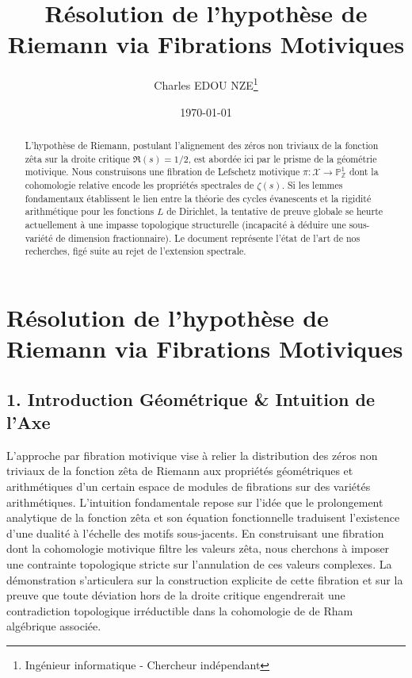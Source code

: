 \documentclass[
]{article}
\title{Résolution de l'hypothèse de Riemann via Fibrations Motiviques}
\author{Charles EDOU NZE\thanks{Ingénieur informatique - Chercheur indépendant}}
\date{\today}
\begin{document}
\maketitle


\begin{abstract}
L'hypothèse de Riemann, postulant l'alignement des zéros non triviaux de la fonction zêta sur la droite critique $\Re(s)=1/2$, est abordée ici par le prisme de la géométrie motivique. Nous construisons une fibration de Lefschetz motivique $\pi : \mathcal{X} \to \mathbb{P}^1_{\mathbb{Z}}$ dont la cohomologie relative encode les propriétés spectrales de $\zeta(s)$. Si les lemmes fondamentaux établissent le lien entre la théorie des cycles évanescents et la rigidité arithmétique pour les fonctions $L$ de Dirichlet, la tentative de preuve globale se heurte actuellement à une impasse topologique structurelle (incapacité à déduire une sous-variété de dimension fractionnaire). Le document représente l'état de l'art de nos recherches, figé suite au rejet de l'extension spectrale.
\end{abstract}

\hypertarget{ruxe9solution-de-lhypothuxe8se-de-riemann-via-fibrations-motiviques}{%
\section{Résolution de l'hypothèse de Riemann via Fibrations
Motiviques}\label{ruxe9solution-de-lhypothuxe8se-de-riemann-via-fibrations-motiviques}}

\hypertarget{introduction-guxe9omuxe9trique-intuition-de-laxe}{%
\subsection{1. Introduction Géométrique \& Intuition de
l'Axe}\label{introduction-guxe9omuxe9trique-intuition-de-laxe}}

L'approche par fibration motivique vise à relier la distribution des
zéros non triviaux de la fonction zêta de Riemann aux propriétés
géométriques et arithmétiques d'un certain espace de modules de
fibrations sur des variétés arithmétiques. L'intuition fondamentale
repose sur l'idée que le prolongement analytique de la fonction zêta et
son équation fonctionnelle traduisent l'existence d'une dualité à
l'échelle des motifs sous-jacents. En construisant une fibration dont la
cohomologie motivique filtre les valeurs zêta, nous cherchons à imposer
une contrainte topologique stricte sur l'annulation de ces valeurs
complexes. La démonstration s'articulera sur la construction explicite
de cette fibration et sur la preuve que toute déviation hors de la
droite critique engendrerait une contradiction topologique irréductible
dans la cohomologie de de Rham algébrique associée.
\end{document}
